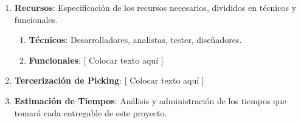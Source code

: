 \documentclass{article}
\begin{document}
\begin{enumerate}
			\begin{enumerate}[label*=\arabic*.]

				\item \textbf{Recursos}: Especificación de los recursos necesarios, divididos en técnicos y funcionales.

					\begin{enumerate}[label*=\arabic*.]
						\itemsep=3pt \topsep=0pt \partopsep=0pt \parskip=0pt \parsep=0pt

						\item \textbf{Técnicos}: Desarrolladores, analistas, tester, diseñadores.

						\item \textbf{Funcionales}: [ Colocar texto aquí ]

					\end{enumerate}
			
				\item \textbf{Tercerización de Picking}: [ Colocar texto aquí ]

				\item \textbf{Estimación de Tiempos}: Análisis y administración de los tiempos que tomará cada entregable de este proyecto.
			\end{enumerate}

	\end{enumerate}
	\medskip

\bigskip







\end{document}
